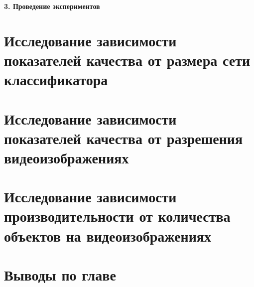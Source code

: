 \newpage
\begin{center}
  \textbf{\large 3. Проведение экспериментов}
\end{center}

\section{Исследование зависимости показателей качества от размера сети классификатора}

\section{Исследование зависимости показателей качества от разрешения видеоизображениях}

\section{Исследование зависимости производительности от количества объектов на видеоизображениях}

\section{Выводы по главе}
